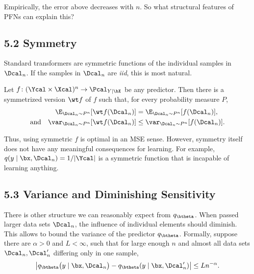 \documentclass[aspectratio=169,10pt]{beamer}
\newcommand{\currentheading}{\ifx\insertsubsection\empty\insertsection\else\insertsubsection\fi}
\begin{document}
\begin{frame}{\currentheading}
Empirically, the error above decreases with $n$. So what structural features of PFNs can explain this?
\end{frame}

\subsection{5.2 Symmetry}

\begin{frame}{\currentheading}
Standard transformers are symmetric functions of the individual samples in $\Dcal_n$. If the samples in $\Dcal_n$ are \emph{iid}, this is most natural.
\end{frame}

\begin{frame}{\currentheading}
\begin{lemma}[5.1]\label{thm:symmetry}
Let $f \colon (\Ycal \times \Xcal)^n \to \Pcal_{Y \mid \bX}$ be any predictor. Then there is a symmetrized version $\wt f$ of $f$ such that, for every probability measure $P$,
\begin{align*}
	\E_{\Dcal_n \sim P^n}[\wt f(\Dcal_n)] &= \E_{\Dcal_n \sim P^n}[f(\Dcal_n)], \\
	\text{and} \quad \var_{\Dcal_n \sim P^n}[\wt f(\Dcal_n)] &\le \var_{\Dcal_n \sim P^n}[f(\Dcal_n)].
\end{align*}
\end{lemma}
\end{frame}

\begin{frame}{\currentheading}
Thus, using symmetric $f$ is optimal in an MSE sense. However, symmetry itself does not have any meaningful consequences for learning. For example, $q(y \mid \bx, \Dcal_n) = 1 / |\Ycal|$ is a symmetric function that is incapable of learning anything.
\end{frame}

\subsection{5.3 Variance and Diminishing Sensitivity}

\begin{frame}{\currentheading}
There is other structure we can reasonably expect from $q_{\btheta}$. When passed larger data sets $\Dcal_n$, the influence of individual elements should diminish. This allows to bound the variance of the predictor $q_{\btheta}$. Formally, suppose there are $\alpha > 0$ and $L < \infty$, such that for large enough $n$ and almost all data sets $\Dcal_n, \Dcal_n'$ differing only in one sample,
\begin{align*}
         \bigl| q_{\btheta}\bigl(y \mid \bx, \Dcal_n\bigr) - q_{\btheta}(y \mid \bx, \Dcal_n') \bigr|
         \le L n^{-\alpha}. \label{eq:bdiff}
\end{align*}
\end{frame}
\end{document}
